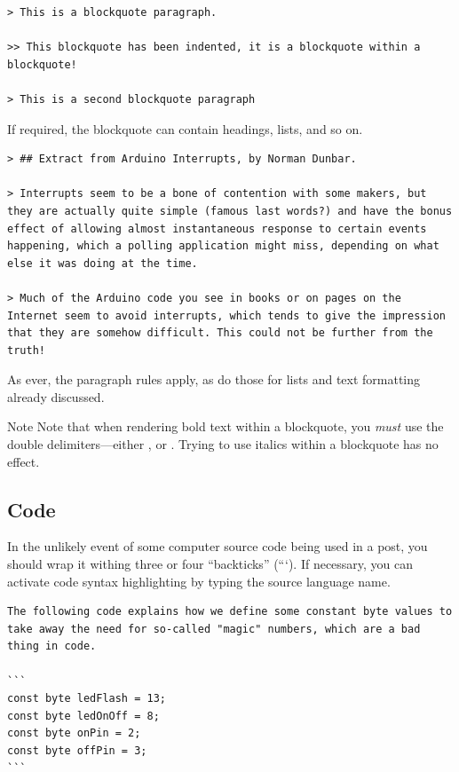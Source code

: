 \begin{lstlisting}[caption={Blockquotes.},style=myText]
> This is a blockquote paragraph.

>> This blockquote has been indented, it is a blockquote within a blockquote!

> This is a second blockquote paragraph
\end{lstlisting}

If required, the blockquote can contain headings, lists, and so on.

\begin{lstlisting}[caption={Blockquotes.},style=myText]
> ## Extract from Arduino Interrupts, by Norman Dunbar.

> Interrupts seem to be a bone of contention with some makers, but they are actually quite simple (famous last words?) and have the bonus effect of allowing almost instantaneous response to certain events happening, which a polling application might miss, depending on what else it was doing at the time.

> Much of the Arduino code you see in books or on pages on the Internet seem to avoid interrupts, which tends to give the impression that they are somehow difficult. This could not be further from the truth!
\end{lstlisting}

As ever, the paragraph rules apply, as do those for lists and text formatting already discussed.

\begin{tips}{Note}
    Note that when rendering bold text within a blockquote, you \emph{must} use the double delimiters---either , or . Trying to use italics within a blockquote has no effect.
\end{tips}

\subsection{Code}\label{sect: Code}

In the unlikely event of some computer source code being used in a post, you should wrap it withing three or four ``backticks'' (```). If necessary, you can activate code syntax highlighting by typing the source language name.

\begin{lstlisting}[caption={Source code.},style=myText]
The following code explains how we define some constant byte values to take away the need for so-called "magic" numbers, which are a bad thing in code.

```
const byte ledFlash = 13;
const byte ledOnOff = 8;
const byte onPin = 2;
const byte offPin = 3;
```
\end{lstlisting}

